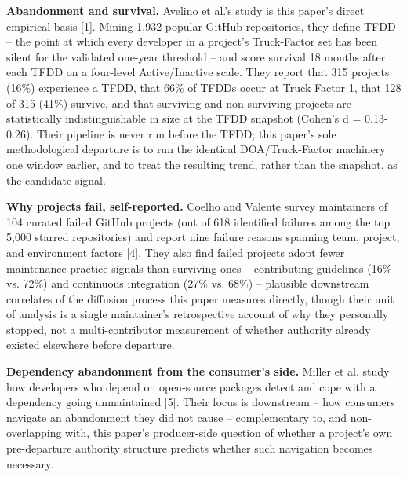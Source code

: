 \documentclass[11pt,letterpaper]{article}
\begin{document}
\textbf{Abandonment and survival.} Avelino et al.'s study is this paper's direct empirical basis [1]. Mining 1,932 popular GitHub repositories, they define TFDD -- the point at which every developer in a project's Truck-Factor set has been silent for the validated one-year threshold -- and score survival 18 months after each TFDD on a four-level Active/Inactive scale. They report that 315 projects (16\%) experience a TFDD, that 66\% of TFDDs occur at Truck Factor 1, that 128 of 315 (41\%) survive, and that surviving and non-surviving projects are statistically indistinguishable in size at the TFDD snapshot (Cohen's d = 0.13-0.26). Their pipeline is never run before the TFDD; this paper's sole methodological departure is to run the identical DOA/Truck-Factor machinery one window earlier, and to treat the resulting trend, rather than the snapshot, as the candidate signal.

\textbf{Why projects fail, self-reported.} Coelho and Valente survey maintainers of 104 curated failed GitHub projects (out of 618 identified failures among the top 5,000 starred repositories) and report nine failure reasons spanning team, project, and environment factors [4]. They also find failed projects adopt fewer maintenance-practice signals than surviving ones -- contributing guidelines (16\% vs. 72\%) and continuous integration (27\% vs. 68\%) -- plausible downstream correlates of the diffusion process this paper measures directly, though their unit of analysis is a single maintainer's retrospective account of why they personally stopped, not a multi-contributor measurement of whether authority already existed elsewhere before departure.

\textbf{Dependency abandonment from the consumer's side.} Miller et al. study how developers who depend on open-source packages detect and cope with a dependency going unmaintained [5]. Their focus is downstream -- how consumers navigate an abandonment they did not cause -- complementary to, and non-overlapping with, this paper's producer-side question of whether a project's own pre-departure authority structure predicts whether such navigation becomes necessary.
\end{document}
